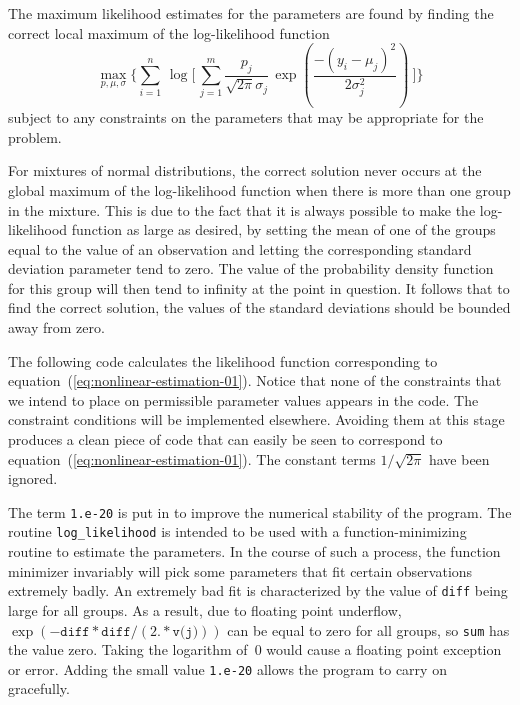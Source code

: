 \documentclass{admbmanual}
\begin{document}
The maximum likelihood estimates for the parameters are found by finding the
correct local maximum of the log-likelihood function
\begin{equation}\label{eq:nonlinear-estimation-01} %
  \max_{p,\mu,\sigma}
   \Bigg\{
       \sum_{i=1}^n \,\log
         \Bigg[\,
             \sum_{j=1}^m \frac{p_j}{\sqrt{2\pi}\sigma_j}
               \,\exp
                   \left(
                       \frac{-(y_i-\mu_j)^2}{2\sigma_j^2}
                   \right)\
          \Bigg]
    \Bigg\}
\end{equation}
subject to any constraints on the parameters that may be appropriate for the
problem.

For mixtures of normal distributions, the correct solution never occurs at the
global maximum of the log-likelihood function when there is more than one group
in the mixture. This is due to the fact that it is always possible to make the
log-likelihood function as large as desired, by setting the mean of one of the
groups equal to the value of an observation and letting the corresponding
standard deviation parameter tend to zero. The value of the probability density
function for this group will then tend to infinity at the point in question. It
follows that to find the correct solution, the values of the standard deviations
should be bounded away from zero.

The following code calculates the likelihood function corresponding to
equation~(\ref{eq:nonlinear-estimation-01}). Notice that none of the constraints
that we intend to place on permissible parameter values appears in the code. The
constraint conditions will be implemented elsewhere. Avoiding them at this stage
produces a clean piece of code that can easily be seen to correspond to
equation~(\ref{eq:nonlinear-estimation-01}). The constant terms $1/\sqrt{2\pi}$
have been ignored.


The term \texttt{1.e-20} is put in to improve the numerical stability of the
program. The routine \texttt{log\_likelihood} is intended to be used with a
function-minimizing routine to estimate the parameters. In the course of such a
process, the function minimizer invariably will pick some parameters that fit
certain observations extremely badly. An extremely bad fit is characterized by
the value of \texttt{diff} being large for all groups. As a result, due to
floating point underflow,
$\exp(-\texttt{diff}*\texttt{diff}/(2.*\texttt{v(j)}))$ can be equal to zero for
all groups, so \texttt{sum} has the value zero. Taking the logarithm of~$0$
would cause a floating point exception or error. Adding the small value
\texttt{1.e-20} allows the program to carry on gracefully.
\end{document}
